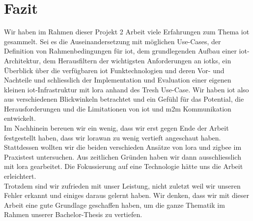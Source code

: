 \chapter{Fazit}

Wir haben im Rahmen dieser Projekt 2 Arbeit viele Erfahrungen zum Thema \gls{iot} gesammelt. Sei es die Auseinandersetzung mit möglichen Use-Cases, der Definition von Rahmenbedingungen für \gls{iot}, dem grundlegenden Aufbau einer \gls{iot}-Architektur, dem Herausfiltern der wichtigsten Anforderungen an \glspl{iotk}, ein Überblick über die verfügbaren \gls{iot} Funktechnologien und deren Vor- und Nachteile und schliesslich der Implementation und Evaluation einer eigenen kleinen \gls{iot}-Infrastruktur mit \gls{lora} anhand des Tresh Use-Case. Wir haben \gls{iot} also aus verschiedenen Blickwinkeln betrachtet und ein Gefühl für das Potential, die Herausforderungen und die Limitationen von \gls{iot} und \acrshort{m2m} Kommunikation entwickelt.\\
Im Nachhinein bereuen wir ein wenig, dass wir erst gegen Ende der Arbeit festgestellt haben, dass wir \gls{lorawan} zu wenig vertieft angeschaut haben. Stattdessen wollten wir die beiden verschieden Ansätze von \gls{lora} und \gls{zigbee} im Praxistest untersuchen. Aus zeitlichen Gründen haben wir dann ausschliesslich mit \gls{lora} gearbeitet. Die Fokussierung auf eine Technologie hätte uns die Arbeit erleichtert.\\
Trotzdem sind wir zufrieden mit unser Leistung, nicht zuletzt weil wir unseren Fehler erkannt und einiges daraus gelernt haben. Wir denken, dass wir mit dieser Arbeit eine gute Grundlage geschaffen haben, um die ganze Thematik im Rahmen unserer Bachelor-Thesis zu vertiefen.
